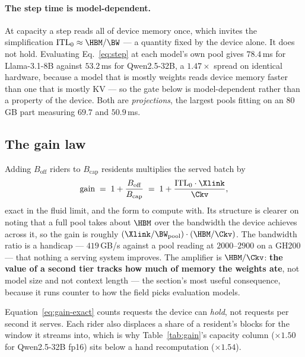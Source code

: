 \paragraph{The step time is model-dependent.}
\label{sec:model:modeldep}
At capacity a step reads all of device memory once, which invites the
simplification $\mathrm{ITL}_0 \approx \HBM/\BW$ --- a quantity fixed by the device
alone. It does not hold. Evaluating Eq.~\ref{eq:step} at each model's own pool
gives $78.4$\,ms for Llama-3.1-8B against $53.2$\,ms for Qwen2.5-32B, a
$1.47\times$ spread on identical hardware, because a model that is mostly weights
reads device memory faster than one that is mostly KV --- so the gate below is
model-dependent rather than a property of the device. Both are
\emph{projections}, the largest pools fitting on an 80\,GB part measuring $69.7$
and $50.9$\,ms.

\subsection{The gain law}
\label{sec:model:gain}

Adding $B_{\mathrm{off}}$ riders to $B_{\mathrm{cap}}$ residents multiplies the
served batch by
%
\begin{equation}
\label{eq:gain-exact}
\text{gain} \;=\; 1 + \frac{B_{\mathrm{off}}}{B_{\mathrm{cap}}}
      \;=\; 1 + \frac{\mathrm{ITL}_0 \cdot \Xlink}{\Ckv},
\end{equation}
%
exact in the fluid limit, and the form to compute with. Its structure is clearer on
noting that a full pool takes about $\HBM$ over the bandwidth the device achieves
across it, so the gain is roughly $(\Xlink/\BW_{\mathrm{pool}})\cdot(\HBM/\Ckv)$.
The bandwidth ratio is a handicap --- $419$\,GB/s against a pool reading at
$2000$--$2900$ on a GH200 --- that nothing a serving system improves. The amplifier
is $\HBM/\Ckv$: \textbf{the value of a second tier tracks how much of memory the
weights ate}, not model size and not context length --- the section's most useful
consequence, because it runs counter to how the field picks evaluation models.

Equation~\ref{eq:gain-exact} counts requests the device can \emph{hold}, not
requests per second it serves. Each rider also displaces a share of a resident's
blocks for the window it streams into, which is why Table~\ref{tab:gain}'s
capacity column ($\times1.50$ for Qwen2.5-32B fp16) sits below a hand
recomputation ($\times1.54$).

